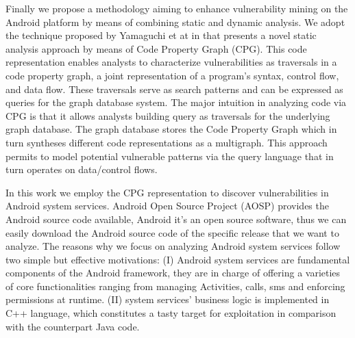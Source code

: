 Finally we propose a methodology aiming to enhance vulnerability mining on the Android platform by means of combining static and dynamic analysis. 
We adopt the technique proposed by Yamaguchi et at in \cite{yamaguchi2014modeling,yamaguchi2015automatic,yamaguchi2011vulnerability} that presents a novel static analysis approach by means of Code Property Graph (CPG). This code representation enables analysts to characterize vulnerabilities as traversals in a code property graph, a joint representation of a program’s syntax, control flow, and data flow. These traversals serve as search patterns and can be expressed as queries for the graph database system. The major intuition in analyzing code via CPG is that it allows analysts building query as traversals for the underlying graph database. The graph database stores the Code Property Graph which in turn syntheses different code representations as a multigraph. This approach permits to model  potential vulnerable patterns via the query language that in turn operates on data/control flows.


In this work we employ the CPG representation to discover vulnerabilities in Android system services. Android Open Source Project (AOSP) provides the Android source code available, Android it's an open source software, thus we can easily download the Android source code of the specific release that we want to analyze.  The reasons why we focus on analyzing Android system services follow two simple but effective motivations: (I) Android system services are fundamental components of the Android framework, they are in charge of offering a varieties of core functionalities ranging from managing Activities, calls, sms and enforcing permissions at runtime. (II) system services' business logic is implemented in C++ language, which constitutes a tasty target for exploitation in comparison with the counterpart Java code.

